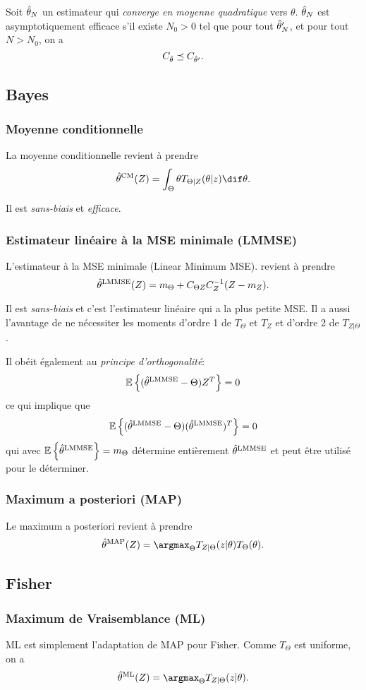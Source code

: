 \begin{mydef}
  Soit $\hat{\theta}_N$ un estimateur qui \emph{converge en moyenne quadratique} vers $\theta$.
  $\hat{\theta}_N$ est asymptotiquement efficace s'il existe $N_0 > 0$ tel que
  pour tout $\hat{\theta}'_N$, et pour tout $N > N_0$, on a
  \[ C_{\hat{\theta}} \preceq C_{\hat{\theta}'}. \]
\end{mydef}

\subsection{Bayes}
\subsubsection{Moyenne conditionnelle}
La moyenne conditionnelle revient à prendre
\[ \esthcm(Z) = \int_{\Theta} \theta T_{\Theta|Z}(\theta|z) \dif \theta. \]

Il est \emph{sans-biais} et \emph{efficace}.

\subsubsection{Estimateur linéaire à la MSE minimale (LMMSE)}
L'estimateur à la MSE minimale (Linear Minimum MSE).
revient à prendre
\[ \hat{\theta}^{\mathrm{LMMSE}}(Z) = m_\Theta + C_{\Theta Z} C_{Z}^{-1}(Z - m_Z). \]

Il est \emph{sans-biais} et c'est l'estimateur linéaire
qui a la plus petite MSE.
Il a aussi l'avantage de ne nécessiter les moments d'ordre
1 de $T_\Theta$ et $T_Z$ et d'ordre 2 de $T_{Z|\Theta}$.

Il obéit également au \emph{principe d'orthogonalité}:
\[ \mathbb{E}\left\{(\hat{\theta}^{\mathrm{LMMSE}} - \Theta)Z^T\right\} = 0 \]
ce qui implique que
\[ \mathbb{E}\left\{(\hat{\theta}^{\mathrm{LMMSE}} - \Theta)(\hat{\theta}^{\mathrm{LMMSE}})^T\right\} = 0 \]
qui avec $\mathbb{E}\left\{\hat{\theta}^{\mathrm{LMMSE}}\right\} = m_\Theta$ détermine entièrement
$\hat{\theta}^{\mathrm{LMMSE}}$ et peut être utilisé pour le déterminer.

\subsubsection{Maximum a posteriori (MAP)}
Le maximum a posteriori revient à prendre
\[ \esthmap(Z) = \argmax_{\Theta} T_{Z|\Theta}(z|\theta) T_{\Theta}(\theta). \]

\subsection{Fisher}
\subsubsection{Maximum de Vraisemblance (ML)}
ML est simplement l'adaptation de MAP pour Fisher.
Comme $T_{\Theta}$ est uniforme, on a
\[ \esthml(Z) = \argmax_{\Theta} T_{Z|\Theta}(z|\theta). \]

